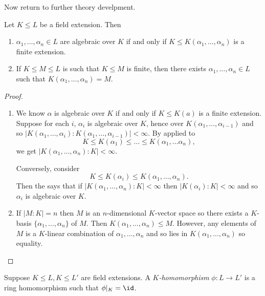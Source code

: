 \documentclass[a4paper]{article}
\begin{document}
Now return to further theory develpment.

\begin{lemma}
  Let \(K \leq L\) be a field extension. Then
  \begin{enumerate}
  \item \(\alpha_1, \dots, \alpha_n \in L\) are algebraic over \(K\) if and only if \(K \leq K(\alpha_1, \dots, \alpha_n)\) is a finite extension.
  \item If \(K \leq M \leq L\) is such that \(K \leq M\) is finite, then there exists \(\alpha_1, \dots, \alpha_n \in L\) such that \(K(\alpha_1, \dots, \alpha_n) = M\).
  \end{enumerate}
\end{lemma}

\begin{proof}\leavevmode
  \begin{enumerate}
  \item We know \(\alpha\) is algebraic over \(K\) if and only if \(K \leq K(a)\) is a finite extension. Suppose for each \(i\), \(\alpha_i\) is algebraic over \(K\), hence over \(K(\alpha_1, \dots, \alpha_{i - 1})\) and so \(|K(\alpha_1, \dots, \alpha_i) : K(\alpha_1, \dots, \alpha_{i - 1})| < \infty\). By  applied to
    \[
      K \leq K(\alpha_1) \leq \dots \leq K(\alpha_1, \dots \alpha_n),
    \]
    we get \(|K(\alpha_1, \dots, \alpha_n) : K| < \infty\).

    Conversely, consider
    \[
      K \leq K(\alpha_i) \leq K(\alpha_1, \dots, \alpha_n).
    \]
    Then the  says that if \(|K(\alpha_1, \dots, \alpha_n) : K| < \infty\) then \(|K(\alpha_i) : K| < \infty\) and so \(\alpha_i\) is algebraic over \(K\).

  \item If \(|M : K| = n\) then \(M\) is an \(n\)-dimensional \(K\)-vector space so there exists a \(K\)-basis \(\{\alpha_1, \dots, \alpha_n\}\) of \(M\). Then \(K(\alpha_1, \dots, \alpha_n) \leq M\). However, any elements of \(M\) is a \(K\)-linear combination of \(\alpha_1, \dots, \alpha_n\) and so lies in \(K(\alpha_1, \dots, \alpha_n)\) so equality.
  \end{enumerate}
\end{proof}

\begin{definition}[\(K\)-homomorphism]
  Suppose \(K \leq L, K \leq L'\) are field extensions. A \emph{\(K\)-homomorphism} \(\phi: L \to L'\) is a ring homomorphism such that \(\phi|_K = \id\).
\end{definition}
\end{document}
